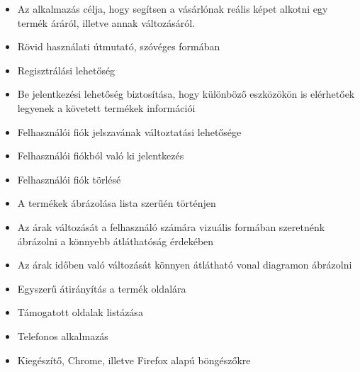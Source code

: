 \begin{itemize}
    \item Az alkalmazás célja, hogy segítsen a vásárlónak reális képet alkotni egy termék áráról, illetve annak változásáról.
    \item Rövid használati útmutató, szóvéges formában
    \item Regisztrálási lehetőség
    \item Be jelentkezési lehetőség biztosítása, hogy különböző eszközökön is elérhetőek legyenek a követett termékek információi
    \item Felhasználói fiók jelszavának változtatási lehetősége
    \item Felhasználói fiókból való ki jelentkezés
    \item Felhasználói fiók törlésé
    \item A termékek ábrázolása lista szerűén történjen
    \item Az árak változását a felhasználó számára vizuális formában szeretnénk ábrázolni a könnyebb átláthatóság érdekében
    \item Az árak időben való változását könnyen átlátható vonal diagramon ábrázolni
    \item Egyszerű átirányítás a termék oldalára
    \item Támogatott oldalak listázása
    \item Telefonos alkalmazás 
	\item Kiegészítő, Chrome, illetve Firefox alapú böngészőkre
\end{itemize}